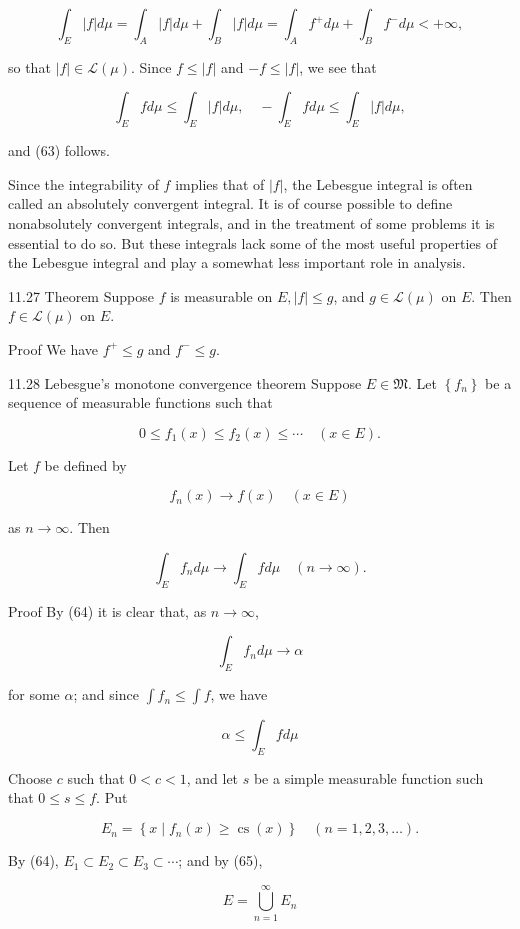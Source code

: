 \documentclass[10pt]{article}
\begin{document}
$$
\int_{E}|f| d \mu=\int_{A}|f| d \mu+\int_{B}|f| d \mu=\int_{A} f^{+} d \mu+\int_{B} f^{-} d \mu<+\infty,
$$

so that $|f| \in \mathscr{L}(\mu)$. Since $f \leq|f|$ and $-f \leq|f|$, we see that

$$
\int_{E} f d \mu \leq \int_{E}|f| d \mu, \quad-\int_{E} f d \mu \leq \int_{E}|f| d \mu,
$$

and (63) follows.

Since the integrability of $f$ implies that of $|f|$, the Lebesgue integral is often called an absolutely convergent integral. It is of course possible to define nonabsolutely convergent integrals, and in the treatment of some problems it is essential to do so. But these integrals lack some of the most useful properties of the Lebesgue integral and play a somewhat less important role in analysis.

11.27 Theorem Suppose $f$ is measurable on $E,|f| \leq g$, and $g \in \mathscr{L}(\mu)$ on $E$. Then $f \in \mathscr{L}(\mu)$ on $E$.

Proof We have $f^{+} \leq g$ and $f^{-} \leq g$.

11.28 Lebesgue's monotone convergence theorem Suppose $E \in \mathfrak{M}$. Let $\left\{f_{n}\right\}$ be a sequence of measurable functions such that

$$
0 \leq f_{1}(x) \leq f_{2}(x) \leq \cdots \quad(x \in E) .
$$

Let $f$ be defined by

$$
f_{n}(x) \rightarrow f(x) \quad(x \in E)
$$

as $n \rightarrow \infty$. Then

$$
\int_{E} f_{n} d \mu \rightarrow \int_{E} f d \mu \quad(n \rightarrow \infty) .
$$

Proof By (64) it is clear that, as $n \rightarrow \infty$,

$$
\int_{E} f_{n} d \mu \rightarrow \alpha
$$

for some $\alpha$; and since $\int f_{n} \leq \int f$, we have

$$
\alpha \leq \int_{E} f d \mu
$$

Choose $c$ such that $0<c<1$, and let $s$ be a simple measurable function such that $0 \leq s \leq f$. Put

$$
E_{n}=\left\{x \mid f_{n}(x) \geq \operatorname{cs}(x)\right\} \quad(n=1,2,3, \ldots) .
$$

By (64), $E_{1} \subset E_{2} \subset E_{3} \subset \cdots$; and by (65),

$$
E=\bigcup_{n=1}^{\infty} E_{n}
$$
\end{document}
